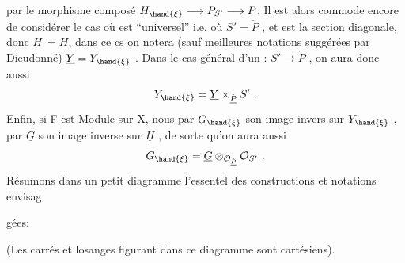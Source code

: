 
par le morphisme composé $H_{\hand{\xi}} \longrightarrow P_{S'} \longrightarrow P$. Il est alors commode
 encore de considérer le cas où \hand{$\xi$} est
``universel'' i.e. où $S' = \check{P}$ , et \hand{$\xi$} est la section diagonale, donc $H \ = \underline{H}$,
dans ce cs on notera (sauf meilleures notations suggérées par Dieudonné)
$\underline{Y} = Y_{\hand{\xi}}$ . Dans le cas général d'un \hand{$\xi$}: $S' \to \check{P}$ , on aura donc aussi
\[ Y_{\hand{\xi}} = \underline{Y} \times_{\check{\underline{P}}} S' \ . \]
Enfin, si F est Module sur X, nous  par $G_{\hand{\xi}}$ son image invers
sur $Y_{\hand{\xi}}$ , par $\underline{G}$ son image inverse sur $\underline{H}$ , de sorte qu'on aura aussi
\[ G_{\hand{\xi}} = \underline{G} \otimes_{\mathcal{O}_{\check{\underline{P}}}} \mathcal{O}_{S'} \ . \]
Résumons dans un petit diagramme l'essentel des constructions et notations envisag

gées:

(Les carrés et losanges figurant dans ce diagramme sont cartésiens).

